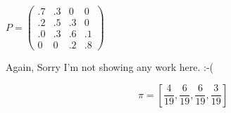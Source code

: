\documentclass{article} %
\theoremstyle{plain}
\theoremstyle{case}
\begin{document}
\begin{enumerate}[label={\fbox{\textbf{Exercise \#\arabic* :}}}]
$P=\left(\begin{array}{llll}.7 & .3 & 0 & 0 \\ .2 & .5 & .3 & 0 \\ .0 & .3 & .6 & .1 \\ 0 & 0 & .2 & .8\end{array}\right)$

    Again, Sorry I'm not showing any work here.  :-(

    \[ \pi = \left [\frac{4}{19},  \frac{6}{19},
            \frac{6}{19}, \frac{3}{19} \right] \]


\end{enumerate}

%
%
\end{document}

